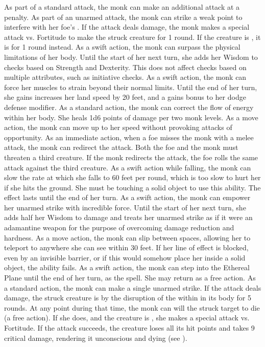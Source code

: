  As part of a standard attack, the monk can make an additional attack at a  penalty.
 As part of an unarmed attack, the monk can strike a weak point to interfere with her foe's \ki. If the attack deals damage, the monk makes a special attack vs. Fortitude to make the struck creature \staggered for 1 round. If the creature is \bloodied, it is \stunned for 1 round instead.
 As a swift action, the monk can surpass the physical limitations of her body. Until the start of her next turn, she adds her Wisdom to checks based on Strength and Dexterity. This does not affect checks based on multiple attributes, such as initiative checks.
 As a swift action, the monk can force her muscles to strain beyond their normal limits. Until the end of her turn, she gains increases her land speed by 20 feet, and a gains  bonus to her dodge defense modifier.
 As a standard action, the monk can correct the flow of energy within her body. She heals 1d6 points of damage per two monk levels.
 As a move action, the monk can move up to her speed without provoking attacks of opportunity.
 As an immediate action, when a foe misses the monk with a melee attack, the monk can redirect the attack. Both the foe and the monk must threaten a third creature. If the monk redirects the attack, the foe rolls the same attack against the third creature.
 As a swift action while falling, the monk can slow the rate at which she falls to 60 feet per round, which is too slow to hurt her if she hits the ground. She must be touching a solid object to use this ability. The effect lasts until the end of her turn.
 As a swift action, the monk can empower her unarmed strike with incredible force. Until the start of her next turn, she adds half her Wisdom to damage and treats her unarmed strike as if it were an adamantine weapon for the purpose of overcoming damage reduction and hardness.
 As a move action, the monk can slip between spaces, allowing her to teleport to anywhere she can see within 30 feet. If her line of effect is blocked, even by an invisible barrier, or if this would somehow place her inside a solid object, the ability fails. 
 As a swift action, the monk can step into the Ethereal Plane until the end of her turn, as the  spell. She may return as a free action.
 As a standard action, the monk can make a single unarmed strike. If the attack deals damage, the struck creature is \sickened by the disruption of the \ki within in its body for 5 rounds. At any point during that time, the monk can will the struck target to die (a free action). If she does, and the creature is \bloodied, she makes a special attack vs. Fortitude. If the attack succeeds, the creature loses all its hit points and takes 9 critical damage, rendering it unconscious and dying (see ).
